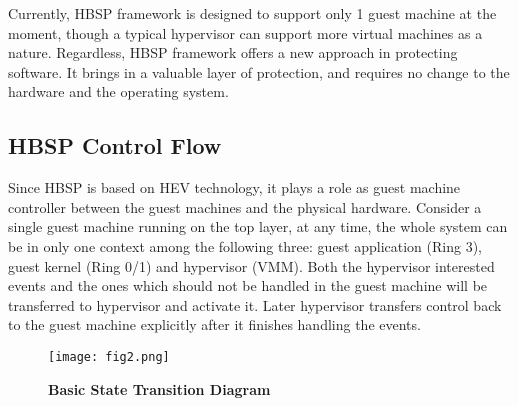 \documentclass[conference]{IEEEtran}
\begin{document}

Currently, HBSP framework is designed to support only 1 guest
machine at the moment, though a typical hypervisor can support
more virtual machines as a nature. Regardless, HBSP framework
offers a new approach in protecting software. It brings in a
valuable layer of protection, and requires no change to the
hardware and the operating system.

\subsection{HBSP Control Flow}
Since HBSP is based on HEV technology, it plays a role as guest
machine controller between the guest machines and the physical
hardware. Consider a single guest machine running on the top
layer, at any time, the whole system can be in only one context
among the following three: guest application (Ring 3), guest
kernel (Ring 0/1) and hypervisor (VMM). Both the hypervisor
interested events and the ones which should not be handled in the
guest machine will be transferred to hypervisor and activate it.
Later hypervisor transfers control back to the guest machine
explicitly after it finishes handling the events.

\begin{figure}[!htb]
\begin{center}
\texttt{[image: fig2.png]}
\end{center}
\caption{{\bf Basic State Transition Diagram}} \label{Figure 2.}
\end{figure}
\end{document}
